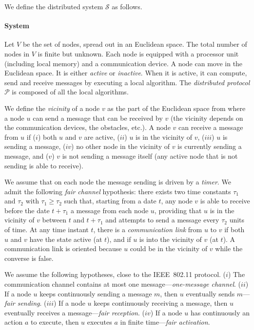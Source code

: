 \documentclass[11pt,english]{article}
\begin{document}
We define the distributed system $\mathcal{S}$ as follows.

\paragraph{System}
Let $V$ be the set of nodes, spread out in an Euclidean space.  The total number
of nodes in $V$ is finite but unknown.  Each node is equipped with a processor
unit (including local memory) and a communication device. A node can move in the
Euclidean space.  It is either \emph{active} or \emph{inactive}. When it is active, it can
compute, send and receive messages by executing a local algorithm.  The
\emph{distributed protocol} $\mathcal{P}$ is composed of all the local
algorithms.

We define the \emph{vicinity} of a node $v$ as the part of the Euclidean space
from where a node $u$ can send a message that can be received by $v$ (the
vicinity depends on the communication devices, the obstacles, etc.).  A node $v$
can receive a message from $u$ if ($i$) both $u$ and $v$ are active, ($ii$) $u$
is in the vicinity of $v$, ($iii$) $u$ is sending a message, ($iv$) no other
node in the vicinity of $v$ is currently sending a message, and ($v$) $v$ is not
sending a message itself (any active node that is not sending is able to
receive).

We assume that on each node the message sending is driven by a {\em timer}.
We admit the following \emph{fair channel} hypothesis: there exists two time
constants $\tau_1$ and $\tau_2$ with $\tau_1 \geq \tau_2$ such that, starting from
a date $t$, any node $v$ is able to receive before the date $t+\tau_1$ a message
from each node $u$, providing that $u$ is in the vicinity of $v$ between $t$ and
$t + \tau_1$ and attempts to send a message every $\tau_2$ units of time.
At any time instant $t$, there is a \emph{communication link} from $u$ to $v$ if
both $u$ and $v$ have the state active (at $t$), and if $u$ is into the vicinity
of $v$ (at $t$).  A communication link is oriented because $u$ could be in the
vicinity of $v$ while the converse is false.

We assume the following hypotheses, close to the IEEE~802.11 protocol.  
($i$) The communication channel contains at most one message---{\em one-message channel}.
($ii$) If a node $u$ keeps continuously sending a message $m$, then $u$ 
eventually sends $m$---{\em fair sending}. 
($iii$) If a node $u$ keeps continuously receiving a message, then $u$ 
eventually receives a message---{\em fair reception}. 
($iv$) If a node $u$ has continuously an action $a$ to execute, then $u$ executes
$a$ in finite time---{\em fair activation}.
\end{document}
